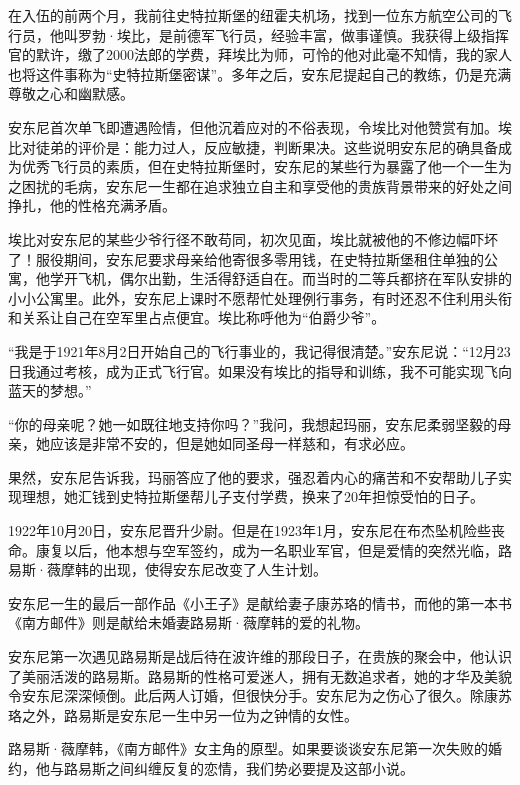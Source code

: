 在入伍的前两个月，我前往史特拉斯堡的纽霍夫机场，找到一位东方航空公司的飞行员，他叫罗勃·埃比，是前德军飞行员，经验丰富，做事谨慎。我获得上级指挥官的默许，缴了2000法郎的学费，拜埃比为师，可怜的他对此毫不知情，我的家人也将这件事称为“史特拉斯堡密谋”。多年之后，安东尼提起自己的教练，仍是充满尊敬之心和幽默感。

安东尼首次单飞即遭遇险情，但他沉着应对的不俗表现，令埃比对他赞赏有加。埃比对徒弟的评价是：能力过人，反应敏捷，判断果决。这些说明安东尼的确具备成为优秀飞行员的素质，但在史特拉斯堡时，安东尼的某些行为暴露了他一个一生为之困扰的毛病，安东尼一生都在追求独立自主和享受他的贵族背景带来的好处之间挣扎，他的性格充满矛盾。

埃比对安东尼的某些少爷行径不敢苟同，初次见面，埃比就被他的不修边幅吓坏了！服役期间，安东尼要求母亲给他寄很多零用钱，在史特拉斯堡租住单独的公寓，他学开飞机，偶尔出勤，生活得舒适自在。而当时的二等兵都挤在军队安排的小小公寓里。此外，安东尼上课时不愿帮忙处理例行事务，有时还忍不住利用头衔和关系让自己在空军里占点便宜。埃比称呼他为“伯爵少爷”。

“我是于1921年8月2日开始自己的飞行事业的，我记得很清楚。”安东尼说：“12月23日我通过考核，成为正式飞行官。如果没有埃比的指导和训练，我不可能实现飞向蓝天的梦想。”

“你的母亲呢？她一如既往地支持你吗？”我问，我想起玛丽，安东尼柔弱坚毅的母亲，她应该是非常不安的，但是她如同圣母一样慈和，有求必应。

果然，安东尼告诉我，玛丽答应了他的要求，强忍着内心的痛苦和不安帮助儿子实现理想，她汇钱到史特拉斯堡帮儿子支付学费，换来了20年担惊受怕的日子。

1922年10月20日，安东尼晋升少尉。但是在1923年1月，安东尼在布杰坠机险些丧命。康复以后，他本想与空军签约，成为一名职业军官，但是爱情的突然光临，路易斯·薇摩韩的出现，使得安东尼改变了人生计划。


\stoptitle

\starttitle[title={7}]

安东尼一生的最后一部作品《小王子》是献给妻子康苏珞的情书，而他的第一本书《南方邮件》则是献给未婚妻路易斯·薇摩韩的爱的礼物。

安东尼第一次遇见路易斯是战后待在波许维的那段日子，在贵族的聚会中，他认识了美丽活泼的路易斯。路易斯的性格可爱迷人，拥有无数追求者，她的才华及美貌令安东尼深深倾倒。此后两人订婚，但很快分手。安东尼为之伤心了很久。除康苏珞之外，路易斯是安东尼一生中另一位为之钟情的女性。

路易斯·薇摩韩，《南方邮件》女主角的原型。如果要谈谈安东尼第一次失败的婚约，他与路易斯之间纠缠反复的恋情，我们势必要提及这部小说。

